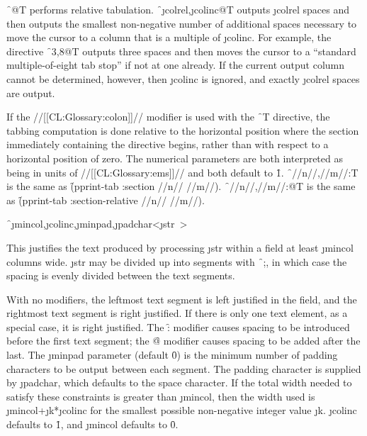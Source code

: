 \f{~@T} performs relative tabulation.
\f{~\j{colrel},\j{colinc}@T} outputs \j{colrel} spaces
and then outputs the smallest non-negative
number of additional spaces necessary to move the cursor
to a column that is a multiple                                       
of \j{colinc}.  For example, the directive 
\f{~3,8@T} outputs
three spaces and then moves the cursor to a ``standard multiple-of-eight
tab stop'' if not at one already.
If the current output column cannot be determined, however,
then \j{colinc} is ignored, and exactly \j{colrel} spaces are output.

If the //[[CL:Glossary:colon]]// modifier is used with the \f{~T} directive,
the tabbing computation is done relative to the horizontal position where the
section immediately containing the directive begins, rather than with
respect to a horizontal position of zero.  The numerical parameters are
both interpreted as being in units of //[[CL:Glossary:ems]]// and both default to \f{1}.
\f{~//n//,//m//:T} is the same as 
  \f{(pprint-tab :section //n// //m//)}.
\f{~//n//,//m//:@T} is the same as
  \f{(pprint-tab :section-relative //n// //m//)}.

\endsubsubsection%



\f{~\j{mincol},\j{colinc},\j{minpad},\j{padchar}<\j{str}~>}

This justifies the text produced by processing \j{str}
within a field at least \j{mincol} columns wide.  \j{str}
may be divided up into segments with \f{~;}, in which case the
spacing is evenly divided between the text segments.


With no modifiers, the leftmost text segment is left justified in the
field, and the rightmost text segment is right justified.  If there is
only one text element, as a special case, it is right justified.
The \f{:} modifier causes                                            
spacing to be introduced before the first text segment;  the 
\f{@} modifier causes spacing to be added after the last.
The \j{minpad} parameter (default \f{0}) is the minimum number of
padding characters to be output between each segment.
The padding character is supplied by \j{padchar},
which defaults to the space character.
If the total width needed to satisfy these constraints is greater
than \j{mincol}, then the width used is \j{mincol}+\j{k}*\j{colinc}
for the smallest possible non-negative integer value \j{k}.
\j{colinc} defaults to \f{1}, and \j{mincol} defaults to \f{0}.


